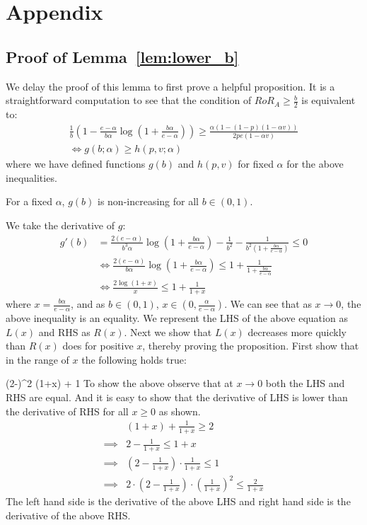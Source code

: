 \newpage
\section{Appendix}

\subsection{Proof of Lemma~\ref{lem:lower_b}}
\proof
We delay the proof of this lemma to first prove a helpful proposition. It is a straightforward computation to see that the condition of $RoR_A \geq \frac{b}{2}$ is equivalent to:
\begin{gather*}
\frac{1}{b}\left(1-\frac{e-\alpha}{b\alpha}\log \left(1+\frac{b\alpha}{e-\alpha} \right) \right) \geq \frac{\alpha(1-(1-p)(1-\alpha v))}{2pe(1-\alpha v)} \\
\iff
g(b; \alpha) \geq h(p, v; \alpha)
\end{gather*}
where we have defined functions $g(b)$ and $h(p,v)$ for fixed $\alpha$ for the above inequalities. 

\begin{proposition}
For a fixed $\alpha$, $g(b)$ is non-increasing for all $b \in (0,1)$. 
\end{proposition}

\proof
We take the derivative of $g$:
\begin{align*}
g'(b) &= \frac{2(e-\alpha)}{b^3 \alpha} \log\left(1+\frac{b\alpha}{e-\alpha} \right) - \frac{1}{b^2}-\frac{1}{b^2\left(1+\frac{b\alpha}{e-\alpha}\right)} \leq 0 \\
&\iff \frac{2(e-\alpha)}{b \alpha} \log\left(1+\frac{b\alpha}{e-\alpha} \right) \leq 1+\frac{1}{1+\frac{b\alpha}{e-\alpha}} \\
&\iff \frac{2\log(1+x)}{x} \leq 1+\frac{1}{1+x}
\end{align*}
where $x = \frac{b\alpha}{e-\alpha}$, and as $b \in (0,1)$, $x \in (0, \frac{\alpha}{e-\alpha})$. We can see that as $x \rightarrow 0$, the above inequality is an equality. 
We represent the LHS of the above equation as $L(x)$ and RHS as $R(x)$. Next we show that $L(x)$ decreases more quickly than $R(x)$ does for positive $x$, thereby proving the proposition.
First show that in the range of $x$ the following holds true:

\beq
\label{eq:eq00}
\left(2-\right)^2 \log(1+x) + 1
\eeq
To show the above observe that at $x\rightarrow 0$ both the LHS and RHS are equal. And it is easy to show that the derivative of LHS is lower than the derivative of RHS for all $x\ge 0$ as shown.
\begin{align*}
& (1+x) + \frac{1}{1+x} \ge 2\\
\implies & 2 - \frac{1}{1+x} \le 1 + x\\
\implies & \left(2-\frac{1}{1+x}\right)\cdot \frac{1}{1+x} \le 1\\
\implies & 2\cdot \left(2-\frac{1}{1+x}\right)\cdot \left(\frac{1}{1+x}\right)^2 \le \frac{2}{1+x}
\end{align*}
The left hand side is the derivative of the above LHS and right hand side is the derivative of the above RHS.

